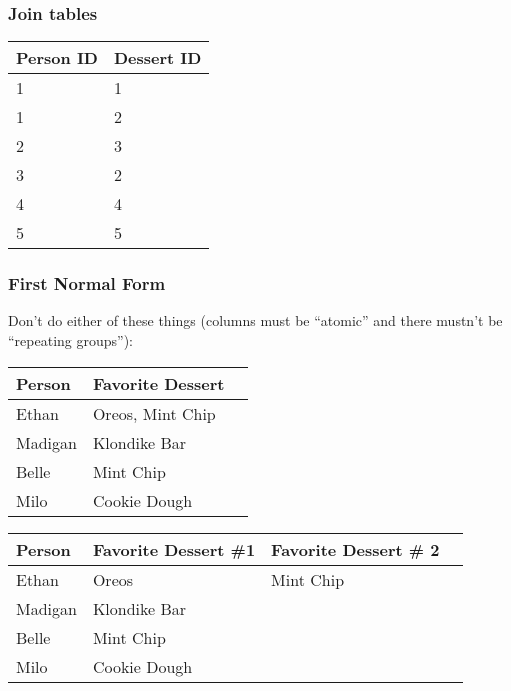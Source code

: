 \documentclass{beamer}
\begin{document}
\begin{frame}
  \frametitle{Join tables}
  \begin{table}[]
    \footnotesize
    \begin{tabular}{@{}ll@{}}
      \toprule
      Person ID & Dessert ID \\ \midrule
      1         & 1          \\
      1         & 2          \\
      2         & 3          \\
      3         & 2          \\
      4         & 4          \\
      5         & 5          \\ \bottomrule
    \end{tabular}
  \end{table}
\end{frame}

\begin{frame}
  \frametitle{First Normal Form}

  Don't do either of these things (columns must be ``atomic'' and there
  mustn't be ``repeating groups''):

  \begin{table}[]
    \footnotesize
    \begin{tabular}{@{}lll@{}}
      \toprule
      Person  & Favorite Dessert \\ \midrule
      Ethan   & Oreos, Mint Chip \\
      Madigan & Klondike Bar     \\
      Belle   & Mint Chip        \\
      Milo    & Cookie Dough     \\ \bottomrule
    \end{tabular}
  \end{table}

  \begin{table}[]
    \footnotesize
    \begin{tabular}{@{}llll@{}}
      \toprule
      Person  & Favorite Dessert \#1 & Favorite Dessert \# 2 \\ \midrule
      Ethan   & Oreos                & Mint Chip             \\
      Madigan & Klondike Bar         &                       \\
      Belle   & Mint Chip            &                       \\
      Milo    & Cookie Dough         &                       \\ \bottomrule
    \end{tabular}
  \end{table}
\end{frame}
\end{document}
